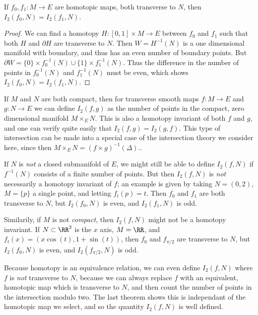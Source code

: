 \begin{theorem}
    If $f_0,f_1: M \to E$ are homotopic maps, both transverse to $N$, then $I_2(f_0,N) = I_2(f_1,N)$.
\end{theorem}
\begin{proof}
    We can find a homotopy $H: [0,1] \times M \to E$ between $f_0$ and $f_1$ such that both $H$ and $\partial H$ are transverse to $N$. Then $W = H^{-1}(N)$ is a one dimensional manifold with boundary, and thus has an even number of boundary points. But $\partial W = \{ 0 \} \times f_0^{-1}(N) \cup \{1 \} \times f_1^{-1}(N)$. Thus the difference in the number of points in $f_0^{-1}(N)$ and $f_1^{-1}(N)$ must be even, which shows $I_2(f_0,N) = I_2(f_1,N)$.
\end{proof}

\begin{remark}
    If $M$ and $N$ are both compact, then for transverse smooth maps $f: M \to E$ and $g: N \to E$ we can define $I_2(f,g)$ as the number of points in the compact, zero dimensional manifold $M \times_E N$. This is also a homotopy invariant of both $f$ and $g$, and one can verify quite easily that $I_2(f,g) = I_2(g,f)$. This type of intersection can be made into a special case of the intersection theory we consider here, since then $M \times_E N = (f \times g)^{-1}(\Delta)$..
\end{remark}

\begin{remark}
    If $N$ is \emph{not} a closed submanifold of $E$, we might still be able to define $I_2(f,N)$ if $f^{-1}(N)$ consists of a finite number of points. But then $I_2(f,N)$ is \emph{not} necessarily a homotopy invariant of $f$; an example is given by taking $N = (0,2)$, $M = \{ p \}$ a single point, and letting $f_t(p) = t$. Then $f_0$ and $f_1$ are both transverse to $N$, but $I_2(f_0,N)$ is even, and $I_2(f_1,N)$ is odd.

    Similarily, if $M$ is not \emph{compact}, then $I_2(f,N)$ might not be a homotopy invariant. If $N \subset \RR^2$ is the $x$ axis, $M = \RR$, and $f_t(x) = (x \cos(t), 1 + \sin(t))$, then $f_0$ and $f_{\pi/2}$ are transverse to $N$, but  $I_2(f_0,N)$ is even, and $I_2(f_{\pi/2}, N)$ is odd.
\end{remark}

Because homotopy is an equivalence relation, we can even define $I_2(f,N)$ where $f$ is \emph{not} transverse to $N$, because we can always replace $f$ with an equivalent, homotopic map which is transverse to $N$, and then count the number of points in the intersection modulo two. The last theorem shows this is independant of the homotopic map we select, and so the quantity $I_2(f,N)$ is well defined.

